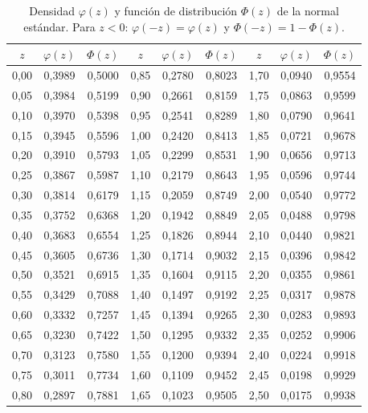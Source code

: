 \begin{table}[h]
\centering\footnotesize
\setlength{\tabcolsep}{4pt}
\caption{Densidad $\varphi(z)$ y función de distribución $\Phi(z)$ de la normal estándar. Para $z<0$: $\varphi(-z)=\varphi(z)$ y $\Phi(-z)=1-\Phi(z)$.}\label{tab:normal}
\begin{tabular}{@{}ccc@{\qquad}ccc@{\qquad}ccc@{}}
\toprule
$z$ & $\varphi(z)$ & $\Phi(z)$ & $z$ & $\varphi(z)$ & $\Phi(z)$ & $z$ & $\varphi(z)$ & $\Phi(z)$ \\
\midrule
0{,}00 & 0{,}3989 & 0{,}5000 & 0{,}85 & 0{,}2780 & 0{,}8023 & 1{,}70 & 0{,}0940 & 0{,}9554 \\
0{,}05 & 0{,}3984 & 0{,}5199 & 0{,}90 & 0{,}2661 & 0{,}8159 & 1{,}75 & 0{,}0863 & 0{,}9599 \\
0{,}10 & 0{,}3970 & 0{,}5398 & 0{,}95 & 0{,}2541 & 0{,}8289 & 1{,}80 & 0{,}0790 & 0{,}9641 \\
0{,}15 & 0{,}3945 & 0{,}5596 & 1{,}00 & 0{,}2420 & 0{,}8413 & 1{,}85 & 0{,}0721 & 0{,}9678 \\
0{,}20 & 0{,}3910 & 0{,}5793 & 1{,}05 & 0{,}2299 & 0{,}8531 & 1{,}90 & 0{,}0656 & 0{,}9713 \\
0{,}25 & 0{,}3867 & 0{,}5987 & 1{,}10 & 0{,}2179 & 0{,}8643 & 1{,}95 & 0{,}0596 & 0{,}9744 \\
0{,}30 & 0{,}3814 & 0{,}6179 & 1{,}15 & 0{,}2059 & 0{,}8749 & 2{,}00 & 0{,}0540 & 0{,}9772 \\
0{,}35 & 0{,}3752 & 0{,}6368 & 1{,}20 & 0{,}1942 & 0{,}8849 & 2{,}05 & 0{,}0488 & 0{,}9798 \\
0{,}40 & 0{,}3683 & 0{,}6554 & 1{,}25 & 0{,}1826 & 0{,}8944 & 2{,}10 & 0{,}0440 & 0{,}9821 \\
0{,}45 & 0{,}3605 & 0{,}6736 & 1{,}30 & 0{,}1714 & 0{,}9032 & 2{,}15 & 0{,}0396 & 0{,}9842 \\
0{,}50 & 0{,}3521 & 0{,}6915 & 1{,}35 & 0{,}1604 & 0{,}9115 & 2{,}20 & 0{,}0355 & 0{,}9861 \\
0{,}55 & 0{,}3429 & 0{,}7088 & 1{,}40 & 0{,}1497 & 0{,}9192 & 2{,}25 & 0{,}0317 & 0{,}9878 \\
0{,}60 & 0{,}3332 & 0{,}7257 & 1{,}45 & 0{,}1394 & 0{,}9265 & 2{,}30 & 0{,}0283 & 0{,}9893 \\
0{,}65 & 0{,}3230 & 0{,}7422 & 1{,}50 & 0{,}1295 & 0{,}9332 & 2{,}35 & 0{,}0252 & 0{,}9906 \\
0{,}70 & 0{,}3123 & 0{,}7580 & 1{,}55 & 0{,}1200 & 0{,}9394 & 2{,}40 & 0{,}0224 & 0{,}9918 \\
0{,}75 & 0{,}3011 & 0{,}7734 & 1{,}60 & 0{,}1109 & 0{,}9452 & 2{,}45 & 0{,}0198 & 0{,}9929 \\
0{,}80 & 0{,}2897 & 0{,}7881 & 1{,}65 & 0{,}1023 & 0{,}9505 & 2{,}50 & 0{,}0175 & 0{,}9938 \\
\bottomrule
\end{tabular}
\end{table}

